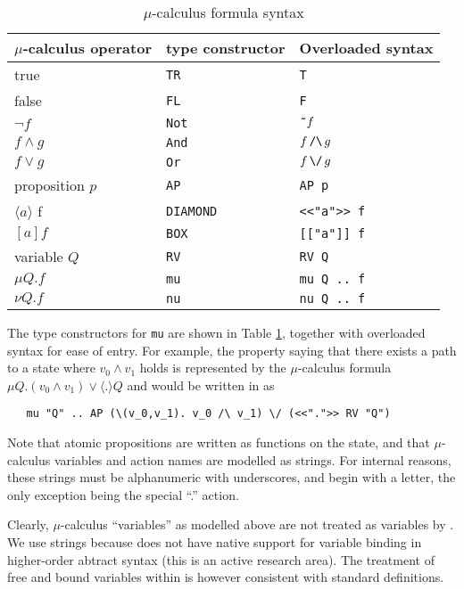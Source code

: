 \begin{table}
\caption{\HOL{} \(\mu\)-calculus formula syntax}
\label{tab_mu}
\begin{tabular}{|l|l|l|}
\hline
\(\mu\)-calculus operator & \HOL{} type constructor & Overloaded syntax \\
\hline
true & \texttt{TR} & \texttt{T} \\
false & \texttt{FL} & \texttt{F} \\
$\lnot f$ & \texttt{Not} & $\texttt{\~{}} f$  \\
$f \land g$ & \texttt{And} & $f\, \hand\, g$ \\
$f \lor g$ & \texttt{Or} & $f\, \hor\, g$ \\
proposition $p$ & \texttt{AP} & \texttt{AP p} \\
$\langle a \rangle$ f& \texttt{DIAMOND} & \verb+<<"a">> f+ \\
$[a] f$  & \texttt{BOX} & \verb+[["a"]] f+ \\
variable $Q$ & \texttt{RV} & \texttt{RV Q} \\
$\mu Q . f$ & \texttt{mu} & \texttt{mu Q .. f} \\
$\nu Q . f$ & \texttt{nu} & \texttt{nu Q .. f} \\
\hline
\end{tabular}
\end{table}

The type constructors for \texttt{mu} are shown in Table \ref{tab_mu}, together with overloaded syntax for ease of entry. For example, the property saying that there exists a path to a state where \( v_0 \land v_1 \) holds is represented by the \(\mu\)-calculus formula \( \mu Q. (v_0 \land v_1) \lor \langle.\rangle Q \) and would be written in \HOL{} as

\begin{verbatim}
   mu "Q" .. AP (\(v_0,v_1). v_0 /\ v_1) \/ (<<".">> RV "Q")
\end{verbatim}

Note that atomic propositions are written as functions on the state, and that \(\mu\)-calculus variables and action names are modelled as \HOL{} strings. For internal reasons, these strings must be alphanumeric with underscores, and begin with a letter, the only exception being the special ``.'' action.

Clearly, \(\mu\)-calculus ``variables'' as modelled above are not treated as variables by \HOL{}. We use strings because \HOL{} does not have native support for variable binding in higher-order abtract syntax (this is an active research area). The treatment of free and bound variables within \hc{} is however consistent with standard definitions.


